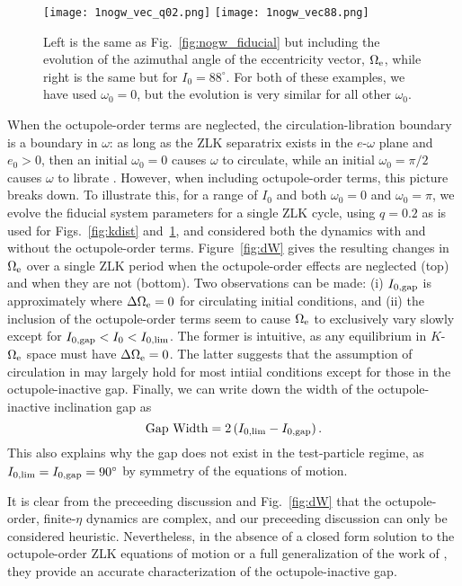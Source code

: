 \documentclass[
        fleqn,
        usenatbib,
    ]{mnras}
\newcommand*{\p}[1]{\left(#1\right)}
\newlength{\colummwidth}
\begin{document}
\begin{figure}
    \centering
    \texttt{[image: 1nogw\_vec\_q02.png]}
    \texttt{[image: 1nogw\_vec88.png]}
    \caption{Left is the same as Fig.~\ref{fig:nogw_fiducial} but including the
    evolution of the azimuthal angle of the eccentricity vector, $\Omega_{\rm
    e}$, while right is the same but for $I_0 = 88^\circ$. For both of
    these examples, we have used $\omega_0 = 0$, but the evolution is very
    similar for all other $\omega_0$.}\label{fig:nogw_circ}
\end{figure}

When the octupole-order terms are neglected, the circulation-libration
boundary is a boundary in $\omega$: as long as the ZLK separatrix exists in the
$e$-$\omega$ plane and $e_0 > 0$, then an initial $\omega_0 = 0$ causes $\omega$
to circulate, while an initial $\omega_0 = \pi/2$ causes $\omega$ to librate
\citep[e.g.,][]{kinoshita, shevchenko2016lidov}. However, when including
octupole-order terms, this picture breaks down. To illustrate this, for a range
of $I_0$ and both $\omega_0 = 0$ and $\omega_0 = \pi$, we evolve the fiducial
system parameters for a single ZLK cycle, using $q = 0.2$ as is used for
Figs.~\ref{fig:kdist} and~\ref{fig:nogw_circ}, and considered both the dynamics
with and without the octupole-order terms. Figure~\ref{fig:dW} gives the
resulting changes in $\Omega_{\rm e}$ over a single ZLK period when the
octupole-order effects are neglected (top) and when they are not (bottom).
Two observations can be made: (i) $I_{\rm 0, gap}$ is approximately where
$\Delta \Omega_{\rm e} = 0$ for circulating initial conditions, and (ii) the
inclusion of the octupole-order terms seem to cause $\Omega_{\rm e}$ to
exclusively vary slowly except for $I_{\rm 0, gap} < I_0 < I_{0, \lim}$. The
former is intuitive, as any equilibrium in $K$-$\Omega_{\rm e}$ space must have
$\Delta \Omega_{\rm e} = 0$. The latter suggests that the assumption of
circulation in \citet{katz2011long} may largely hold for most intiial conditions
except for those in the octupole-inactive gap. Finally, we can write down the
width of the octupole-inactive inclination gap as
\begin{equation}
    \text{Gap Width} = 2\p{I_{0, \lim} - I_{\rm 0, gap}}.
\end{equation}
This also explains why the gap does not exist in the test-particle regime, as
$I_{0, \lim} = I_{\rm 0, gap} = 90^\circ$ by symmetry of the equations of
motion.

It is clear from the preceeding discussion and Fig.~\ref{fig:dW} that the
octupole-order, finite-$\eta$ dynamics are complex, and our preceeding
discussion can only be considered heuristic. Nevertheless, in the absence of a
closed form solution to the octupole-order ZLK equations of motion or a full
generalization of the work of \citet{katz2011long}, they provide an accurate
characterization of the octupole-inactive gap.
\end{document}
